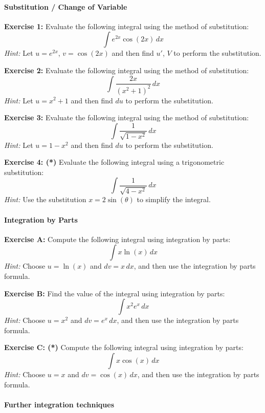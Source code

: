 \documentclass[]{article}
\begin{document}
	\paragraph{Substitution / Change of Variable}\mbox{}
	
	\textbf{Exercise 1:}
	Evaluate the following integral using the method of substitution:
	\[
	\int e^{2x} \cos(2x) \, dx
	\]
	\textit{Hint:} Let \( u = e^{2x} \), \( v = \cos(2x) \) and then find \( u' \), \( V \) to perform the substitution.
	
	\textbf{Exercise 2:}
	Evaluate the following integral using the method of substitution:
	\[
	\int \frac{2x}{(x^2 + 1)^2} \, dx
	\]
	\textit{Hint:} Let \( u = x^2 + 1 \) and then find \( du \) to perform the substitution.
	
	\textbf{Exercise 3:}
	Evaluate the following integral using the method of substitution:
	\[
	\int \frac{1}{\sqrt{1 - x^2}} \, dx
	\]
	\textit{Hint:} Let \( u = 1 - x^2 \) and then find \( du \) to perform the substitution.
	
	\textbf{Exercise 4: (*)}
	Evaluate the following integral using a trigonometric substitution:
	\[
	\int \frac{1}{\sqrt{4 - x^2}} \, dx
	\]
	\textit{Hint:} Use the substitution \(x = 2\sin(\theta)\) to simplify the integral.
	
	
	\paragraph{Integration by Parts}\mbox{}
	
	\textbf{Exercise A:}
	Compute the following integral using integration by parts:
	\[
	\int x \ln(x) \, dx
	\]
	\textit{Hint:} Choose \( u = \ln(x) \) and \( dv = x \, dx \), and then use the integration by parts formula.
	
	\textbf{Exercise B:}
	Find the value of the integral using integration by parts:
	\[
	\int x^2 e^x \, dx
	\]
	\textit{Hint:} Choose \( u = x^2 \) and \( dv = e^x \, dx \), and then use the integration by parts formula.
	
	\textbf{Exercise C: (*)}
	Compute the following integral using integration by parts:
	\[
	\int x \cos(x) \, dx
	\]
	\textit{Hint:} Choose \( u = x \) and \( dv = \cos(x) \, dx \), and then use the integration by parts formula.
	
	\paragraph{Further integration techniques}\mbox{}
	
\end{document}
